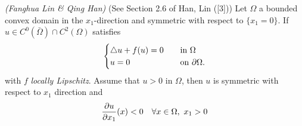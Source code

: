 \documentclass[12pt,a4paper]{article}
\begin{document}
\lem \emph{(Fanghua Lin \& Qing Han)} (See Section 2.6 of Han, Lin ([3])) Let $\Omega$ a bounded convex domain in the $x_1$-direction and symmetric with respect to $\{x_1 =0 \}$. If $u\in C^0(\bar{\Omega}) \cap C^2(\Omega)$ satisfies 
\begin{align*}
\begin{cases}
\triangle u + f(u) =0 \quad &\text{in } \Omega \\
u =0 \quad &\text{on } \partial \Omega.
\end{cases}
\end{align*}
with $f$ \emph{locally Lipschitz}. Assume that $u>0$ in $\Omega$, then $u$ is symmetric with respect to $x_1$ direction and
\begin{align*}
\frac{\partial u}{\partial x_1}(x) < 0 \quad \forall x\in \Omega, \,\, x_1>0
\end{align*}
\end{document}

